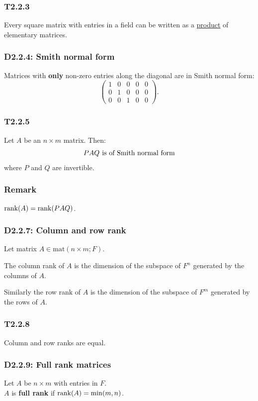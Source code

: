 \documentclass{article}
\begin{document}
\begin{multicols*}{3}
\subsubsection*{T2.2.3}
Every square matrix with entries in a field can be written
as a \underline{product} of elementary matrices.

\subsubsection*{D2.2.4: Smith normal form}
Matrices with \textbf{only} non-zero entries along the diagonal are
in Smith normal form:
$$\begin{pmatrix}
    1 & 0 & 0 & 0 & 0 \\
    0 & 1 & 0 & 0 & 0 \\
    0 & 0 & 1 & 0 & 0
\end{pmatrix}.$$

\subsubsection*{T2.2.5}
Let $A$ be an $n\times m$ matrix. Then:
$$PAQ\hspace{0.05in}\text{is of Smith normal form}$$
where $P$ and $Q$ are invertible.

\subsubsection*{Remark}
$\rank(A)=\rank(PAQ)$.

\subsubsection*{D2.2.7: Column and row rank}
Let matrix $A\in\text{mat}(n\times m;F)$.

The column rank of $A$ is the dimension of the subspace
of $F^n$ generated by the columns of $A$.

Similarly the row rank of $A$ is the dimension of the subspace
of $F^m$ generated by the rows of $A$.

\subsubsection*{T2.2.8}
Column and row ranks are equal.

\subsubsection*{D2.2.9: Full rank matrices}
Let $A$ be $n\times m$ with entries in $F$. \\
$A$ is \textbf{full rank} if $\rank(A)=\min(m,n)$.


\end{multicols*}
\end{document}

